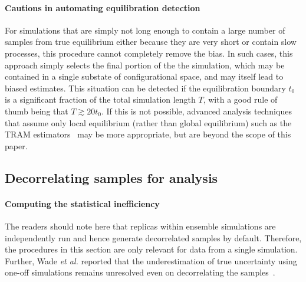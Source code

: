 \documentclass[9pt,bestpractices]{livecoms}
\begin{document}
\paragraph{Cautions in automating equilibration detection}
For simulations that are simply not long enough to contain a large number of samples from true equilibrium either because they are very short or contain slow processes, this procedure cannot completely remove the bias.
In such cases, this approach simply selects the final portion of the the simulation, which may be contained in a single substate of configurational space, and may itself lead to biased estimates. 
This situation can be detected if the equilibration boundary $t_0$ is a significant fraction of the total simulation length $T$, with a good rule of thumb being that $T \gtrsim 20 t_0$.
If this is not possible, advanced analysis techniques that assume only local equilibrium (rather than global equilibrium) such as the TRAM estimators~\cite{mey2014xtram,wu2016multiensemble,nuske2017markov} may be more appropriate, but are beyond the scope of this paper.


\subsection{Decorrelating samples for analysis}
\label{sec:decorrelating-samples}
\paragraph{Computing the statistical inefficiency}
The readers should note here that replicas within ensemble simulations are independently run and hence generate decorrelated samples by default. Therefore, the procedures in this section are only relevant for data from a single simulation. Further, Wade \textit{et al.} reported that the underestimation of true uncertainty using one-off simulations remains unresolved even on decorrelating the samples~\cite{wade2022}.
\end{document}

